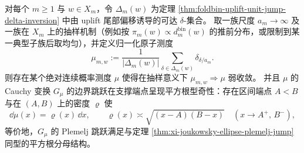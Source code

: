 \begin{conjecture}\label{conj:xi-foldbin-delta-measure-sqrt-edge-bridge}
对每个 \(m\ge 1\) 与 \(w\in X_m\)，令 \(\Delta_m(w)\) 为定理 \ref{thm:foldbin-uplift-unit-jump-delta-inversion} 中由 uplift 尾部偏移诱导的可达 \(\delta\)-集合。
取一族尺度 \(a_m\to\infty\) 及一族在 \(X_m\) 上的抽样机制（例如按 \(\pi_m(w)\propto d_m^{\mathrm{bin}}(w)\) 的推前分布，或限制到某一典型子族后取均匀），并定义归一化原子测度
\[
\mu_{m,w}:=\frac{1}{|\Delta_m(w)|}\sum_{\delta\in\Delta_m(w)}\delta_{\delta/a_m}.
\]
则存在某个绝对连续概率测度 \(\mu\) 使得在抽样意义下
\(\mu_{m,w}\Rightarrow \mu\) 弱收敛。
并且 \(\mu\) 的 Cauchy 变换 \(G_\mu\) 的边界跳跃在支撑端点呈现平方根型奇性：存在区间端点 \(A<B\) 与在 \((A,B)\) 上的密度 \(\varrho\) 使
\[
\dd\mu(x)=\varrho(x)\,\dd x,\qquad
\varrho(x)\asymp \sqrt{(x-A)(B-x)}\quad (x\to A^+,\,B^-),
\]
等价地，\(G_\mu\) 的 Plemelj 跳跃满足与定理 \ref{thm:xi-joukowsky-ellipse-plemelj-jump} 同型的平方根分母结构。
\end{conjecture}


